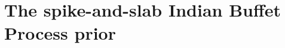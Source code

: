 \documentclass[pdftex]{imsart}
\theoremstyle{plain}
\begin{document}
%

\section{The spike-and-slab Indian Buffet Process prior}
\label{sec:model-and-priors}
\end{document}
